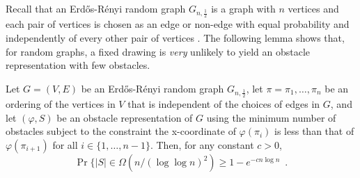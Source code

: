\documentclass{patmorin}
\begin{document}
Recall that an Erd\H{o}s-R\'enyi random graph $G_{n,\frac{1}{2}}$ is a
graph with $n$ vertices and each pair of vertices is chosen as an edge
or non-edge with equal probability and independently of every other pair
of vertices \cite{erdos.renyi:random}.  The following lemma shows that,
for random graphs, a fixed drawing is \emph{very} unlikely to yield
an obstacle representation with few obstacles.


\begin{lem}
  Let $G=(V,E)$ be an Erd\H{o}s-R\'enyi random graph $G_{n,\frac{1}{2}}$,
  let $\pi=\pi_1,\ldots,\pi_n$ be an ordering of the vertices
  in $V$ that is independent of the choices of edges in $G$,
  and let $(\varphi, S)$ be an obstacle representation of $G$
  using the minimum number of obstacles subject to the constraint
  the x-coordinate of $\varphi(\pi_{i})$ is less than that of $\varphi(\pi_{i+1})$ for all $i\in\{1,\ldots,n-1\}$.
  Then, for any constant $c>0$,
  \[
     \Pr\{|S| \in \Omega(n/(\log\log n)^2) \ge 1-e^{-cn\log n}  \enspace .
  \] 
\end{lem}
\end{document}
